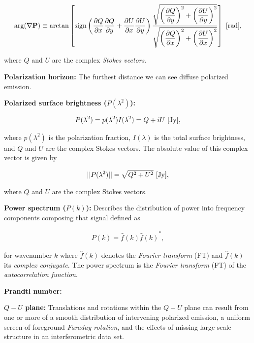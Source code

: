 \documentclass[a4paper,11pt]{article}
\begin{document}
\begin{align*}
    \mathrm{arg}(\nabla\mathbf{P}) \equiv \arctan \left[ \mathrm{sign} \left(\dfrac{\partial Q}{\partial x}\dfrac{\partial Q}{\partial y} + \dfrac{\partial U}{\partial x}\dfrac{\partial U}{\partial y}\right) \dfrac{\sqrt{\left(\dfrac{\partial Q}{\partial y}\right)^2 + \left(\dfrac{\partial U}{\partial y}\right)^2}}{\sqrt{\left(\dfrac{\partial Q}{\partial x}\right)^2 + \left(\dfrac{\partial U}{\partial x}\right)^2}} \right] ~ [{\rm rad}],
\end{align*}

{\noindent}where $Q$ and $U$ are the complex \textit{Stokes vectors}.

{\noindent}\textbf{Polarization horizon:} The furthest distance we can see diffuse polarized emission.

{\noindent}\textbf{Polarized surface brightness ($P(\lambda^2)$):} 

\begin{align*}
    P(\lambda^2) = p(\lambda^2)I(\lambda^2) = Q + iU ~ [{\rm Jy}],
\end{align*}

{\noindent}where $p(\lambda^2)$ is the polarization fraction, $I(\lambda)$ is the total surface brightness, and $Q$ and $U$ are the complex Stokes vectors. The absolute value of this complex vector is given by

\begin{align*}
    \lvert\lvert P(\lambda^2) \rvert\rvert = \sqrt{Q^2 + U^2} ~ [{\rm Jy}],
\end{align*}

{\noindent}where $Q$ and $U$ are the complex Stokes vectors.

{\noindent}\textbf{Power spectrum ($P(k)$):} Describes the distribution of power into frequency components composing that signal defined as

\begin{align*}
    P(k) = \hat{f}(k){\hat{f}(k)}^*,
\end{align*}

{\noindent}for wavenumber $k$ where $\hat{f}(k)$ denotes the \textit{Fourier transform} (FT) and ${\hat{f}(k)}$ its \textit{complex conjugate}. The power spectrum is the \textit{Fourier transform} (FT) of the \textit{autocorrelation function}.

{\noindent}\textbf{Prandtl number:}

{\noindent}\textbf{$Q-U$ plane:} Translations and rotations within the $Q-U$ plane can result from one or more of a smooth distribution of intervening polarized emission, a uniform screen of foreground \textit{Faraday rotation}, and the effects of missing large-scale structure in an interferometric data set.
\end{document}
